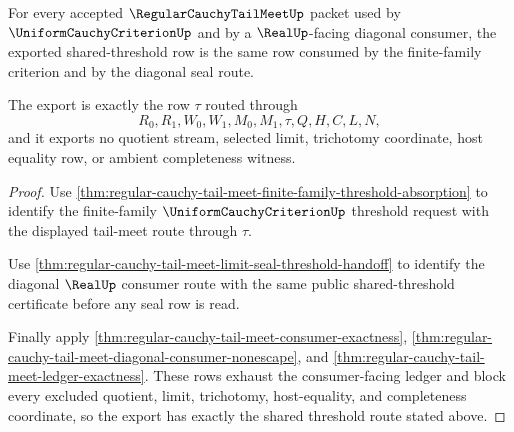 \begin{theorem}
\label{thm:regular-cauchy-tail-meet-uniform-criterion-threshold-export}
For every accepted $\RegularCauchyTailMeetUp$ packet used by $\UniformCauchyCriterionUp$ and by a $\RealUp$-facing diagonal consumer, the exported shared-threshold row is the same row consumed by the finite-family criterion and by the diagonal seal route.

The export is exactly the row $\tau$ routed through
$$
R_0,R_1,W_0,W_1,M_0,M_1,\tau,Q,H,C,L,N,
$$
and it exports no quotient stream, selected limit, trichotomy coordinate, host equality row, or ambient completeness witness.
\end{theorem}
\begin{proof}
Use \autoref{thm:regular-cauchy-tail-meet-finite-family-threshold-absorption} to identify the finite-family $\UniformCauchyCriterionUp$ threshold request with the displayed tail-meet route through $\tau$.

Use \autoref{thm:regular-cauchy-tail-meet-limit-seal-threshold-handoff} to identify the diagonal $\RealUp$ consumer route with the same public shared-threshold certificate before any seal row is read.

Finally apply \autoref{thm:regular-cauchy-tail-meet-consumer-exactness}, \autoref{thm:regular-cauchy-tail-meet-diagonal-consumer-nonescape}, and \autoref{thm:regular-cauchy-tail-meet-ledger-exactness}. These rows exhaust the consumer-facing ledger and block every excluded quotient, limit, trichotomy, host-equality, and completeness coordinate, so the export has exactly the shared threshold route stated above.
\end{proof}

